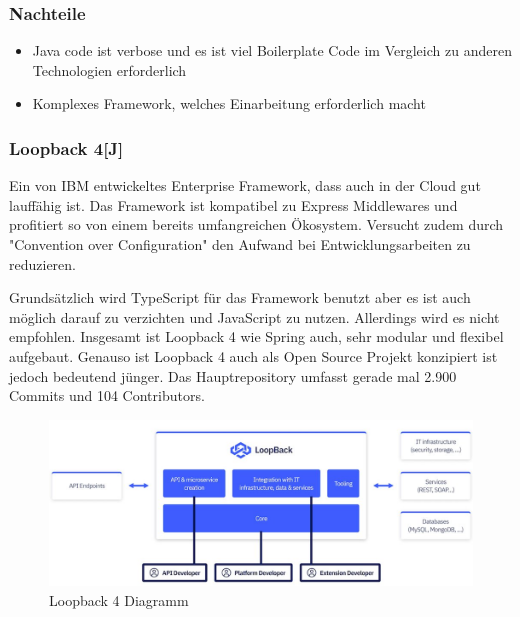 \subsubsection*{Nachteile}
\begin{itemize}
    \item Java code ist verbose und es ist viel Boilerplate Code im Vergleich zu anderen Technologien erforderlich
    \item Komplexes Framework, welches Einarbeitung erforderlich macht
\end{itemize}

\subsubsection*{Loopback 4\hfill[J]}
Ein von IBM entwickeltes Enterprise Framework, dass auch in der Cloud gut lauffähig ist. Das Framework ist kompatibel zu Express Middlewares und profitiert so von einem bereits umfangreichen Ökosystem. Versucht zudem durch "Convention over Configuration" den Aufwand bei Entwicklungsarbeiten zu reduzieren.

Grundsätzlich wird TypeScript für das Framework benutzt aber es ist auch möglich darauf zu verzichten und JavaScript zu nutzen. Allerdings wird es nicht empfohlen. Insgesamt ist Loopback 4 wie Spring auch, sehr modular und flexibel aufgebaut. Genauso ist Loopback 4 auch als Open Source Projekt konzipiert ist jedoch bedeutend jünger. Das Hauptrepository umfasst gerade mal 2.900 Commits und 104 Contributors.

\begin{figure}[!h]
\centering
\includegraphics[width=13cm]{images/0x_technology_stack/loopback_4.png}
\caption{Loopback 4 Diagramm \cite{loopback4}}
\end{figure}

